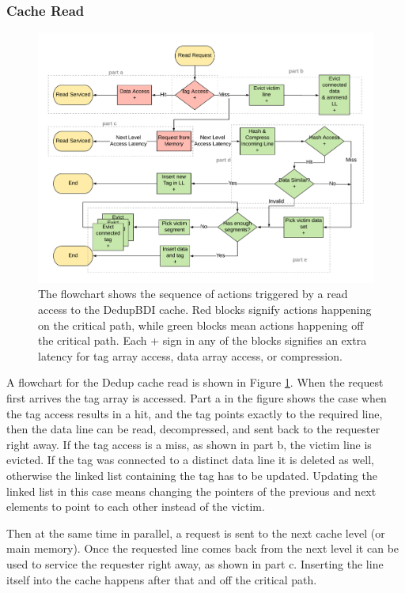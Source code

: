 \subsubsection{Cache Read}
\begin{figure}
    \includegraphics[width=\textwidth]{DedupBDI_Read.pdf}
    \caption[DedupBDI Read]{The flowchart shows the sequence of actions triggered by a read access to the DedupBDI cache. Red blocks signify actions happening on the critical path, while green blocks mean actions happening off the critical path. Each + sign in any of the blocks signifies an extra latency for tag array access, data array access, or compression.}
    \label{fig:DedupBDI_Read}
\end{figure}
A flowchart for the Dedup cache read is shown in Figure \ref{fig:DedupBDI_Read}. When the request first arrives the tag array is accessed. Part a in the figure shows the case when the tag access results in a hit, and the tag points exactly to the required line, then the data line can be read, decompressed, and sent back to the requester right away. If the tag access is a miss, as shown in part b, the victim line is evicted. If the tag was connected to a distinct data line it is deleted as well, otherwise the linked list containing the tag has to be updated. Updating the linked list in this case means changing the pointers of the previous and next elements to point to each other instead of the victim.\par
Then at the same time in parallel, a request is sent to the next cache level (or main memory). Once the requested line comes back from the next level it can be used to service the requester right away, as shown in part c. Inserting the line itself into the cache happens after that and off the critical path.\par
